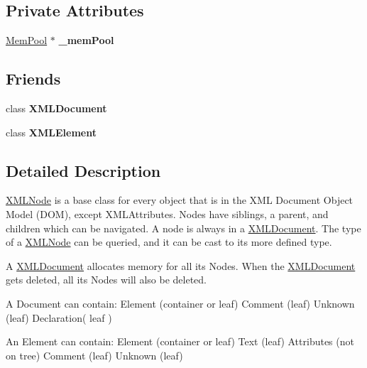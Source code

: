 \subsection*{Private Attributes}
\begin{DoxyCompactItemize}
\item 
\hyperlink{classtinyxml2_1_1MemPool}{Mem\+Pool} $\ast$ {\bfseries \+\_\+mem\+Pool}\hypertarget{classtinyxml2_1_1XMLNode_a4e3ff179bc312480b6bc3e57014834f7}{}\label{classtinyxml2_1_1XMLNode_a4e3ff179bc312480b6bc3e57014834f7}

\end{DoxyCompactItemize}
\subsection*{Friends}
\begin{DoxyCompactItemize}
\item 
class {\bfseries X\+M\+L\+Document}\hypertarget{classtinyxml2_1_1XMLNode_a4eee3bda60c60a30e4e8cd4ea91c4c6e}{}\label{classtinyxml2_1_1XMLNode_a4eee3bda60c60a30e4e8cd4ea91c4c6e}

\item 
class {\bfseries X\+M\+L\+Element}\hypertarget{classtinyxml2_1_1XMLNode_ac2fba9b6e452829dd892f7392c24e0eb}{}\label{classtinyxml2_1_1XMLNode_ac2fba9b6e452829dd892f7392c24e0eb}

\end{DoxyCompactItemize}


\subsection{Detailed Description}
\hyperlink{classtinyxml2_1_1XMLNode}{X\+M\+L\+Node} is a base class for every object that is in the X\+ML Document Object Model (D\+OM), except X\+M\+L\+Attributes. Nodes have siblings, a parent, and children which can be navigated. A node is always in a \hyperlink{classtinyxml2_1_1XMLDocument}{X\+M\+L\+Document}. The type of a \hyperlink{classtinyxml2_1_1XMLNode}{X\+M\+L\+Node} can be queried, and it can be cast to its more defined type.

A \hyperlink{classtinyxml2_1_1XMLDocument}{X\+M\+L\+Document} allocates memory for all its Nodes. When the \hyperlink{classtinyxml2_1_1XMLDocument}{X\+M\+L\+Document} gets deleted, all its Nodes will also be deleted.

\begin{DoxyVerb}A Document can contain: Element (container or leaf)
                        Comment (leaf)
                        Unknown (leaf)
                        Declaration( leaf )

An Element can contain: Element (container or leaf)
                        Text    (leaf)
                        Attributes (not on tree)
                        Comment (leaf)
                        Unknown (leaf)\end{DoxyVerb}
 

